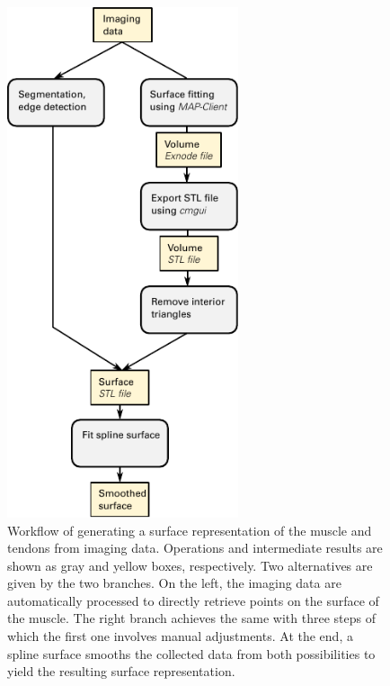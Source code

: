 
\begin{figure}%
  \centering%
  \includegraphics[height=15cm]{images/fiber_creation/scheme_preprocessing.pdf}%
  \caption{Workflow of generating a surface representation of the muscle and tendons from imaging data. Operations and intermediate results are shown as gray and yellow boxes, respectively. Two alternatives are given by the two branches. On the left, the imaging data are automatically processed to directly retrieve points on the surface of the muscle. The right branch achieves the same with three steps of which the first one involves manual adjustments. At the end, a spline surface smooths the collected data from both possibilities to yield the resulting surface representation.}%
  \label{fig:scheme_preprocessing}%
\end{figure}%

